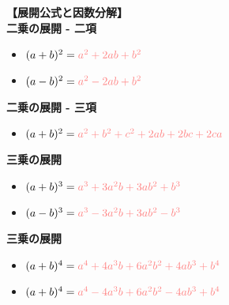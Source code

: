 \documentclass{article}
\begin{document}
\textbf{【展開公式と因数分解】}\\
\textbf{二乗の展開 - 二項}
\begin{itemize}
        \item \((a + b)^2 = \textcolor[rgb]{1,0.5,0.5}{a^2 + 2ab + b^2}\)
        \item \((a - b)^2 = \textcolor[rgb]{1,0.5,0.5}{a^2 - 2ab + b^2}\)
\end{itemize}
\textbf{二乗の展開 - 三項}
\begin{itemize}
        \item \((a + b)^2 = \textcolor[rgb]{1,0.5,0.5}{a^2 + b^2 + c^2 + 2ab + 2bc + 2ca}\)
\end{itemize}
\textbf{三乗の展開}
\begin{itemize}
        \item \((a + b)^3 = \textcolor[rgb]{1,0.5,0.5}{a^3 + 3a^2b + 3ab^2 + b^3}\)
        \item \((a - b)^3 = \textcolor[rgb]{1,0.5,0.5}{a^3 - 3a^2b + 3ab^2 - b^3}\)
\end{itemize}
\textbf{三乗の展開}
\begin{itemize}
        \item \((a + b)^4 = \textcolor[rgb]{1,0.5,0.5}{a^4 + 4a^3b + 6a^2b^2 + 4ab^3 + b^4}\)
        \item \((a + b)^4 = \textcolor[rgb]{1,0.5,0.5}{a^4 - 4a^3b + 6a^2b^2 - 4ab^3 + b^4}\)
\end{itemize}
\end{document}
